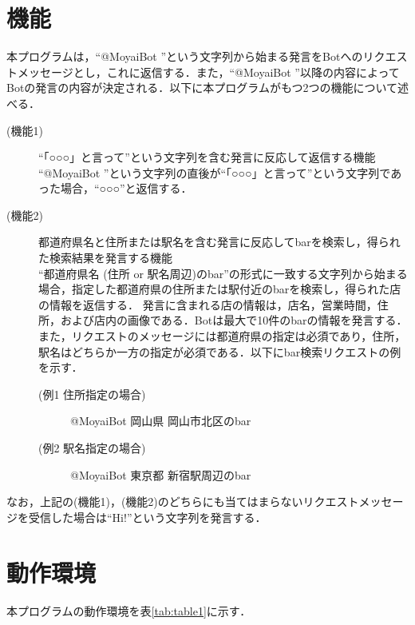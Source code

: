 \documentclass[fleqn, 14pt]{extarticlej}
\begin{document}
\section{機能}
\label{機能}
本プログラムは，``@MoyaiBot ''という文字列から始まる発言をBotへのリクエストメッセージとし，これに返信する．また，``@MoyaiBot ''以降の内容によってBotの発言の内容が決定される．以下に本プログラムがもつ2つの機能について述べる．
\begin{description}
\item[(機能1)] ``「○○○」と言って''という文字列を含む発言に反応して返信する機能\\
  ``@MoyaiBot ''という文字列の直後が``「○○○」と言って''という文字列であった場合，``○○○''と返信する．
  
\item[(機能2)] 都道府県名と住所または駅名を含む発言に反応してbarを検索し，得られた検索結果を発言する機能\\
  ``都道府県名 (住所 or 駅名周辺)のbar''の形式に一致する文字列から始まる場合，指定した都道府県の住所または駅付近のbarを検索し，得られた店の情報を返信する．
  発言に含まれる店の情報は，店名，営業時間，住所，および店内の画像である．Botは最大で10件のbarの情報を発言する．
  また，リクエストのメッセージには都道府県の指定は必須であり，住所，駅名はどちらか一方の指定が必須である．以下にbar検索リクエストの例を示す．
  \begin{description}
  \item[(例1 住所指定の場合)]@MoyaiBot 岡山県 岡山市北区のbar\\
  \item[(例2 駅名指定の場合)]@MoyaiBot 東京都 新宿駅周辺のbar\\  
  \end{description}

\end{description}
なお，上記の(機能1)，(機能2)のどちらにも当てはまらないリクエストメッセージを受信した場合は``Hi!''という文字列を発言する．

\section{動作環境}
\label{動作環境}
本プログラムの動作環境を表\ref{tab:table1}に示す．
\end{document}
